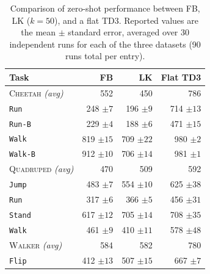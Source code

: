\documentclass{article}
\theoremstyle{plain}
\theoremstyle{definition}
\theoremstyle{remark}
\begin{document}
\begin{table}[t]
\centering
\caption{Comparison of zero-shot performance between FB, LK ($k=50$), and a flat TD3. Reported values are the mean $\pm$ standard error, averaged over 30 independent runs for each of the three datasets (90 runs total per entry).}
\setlength{\tabcolsep}{6pt}
\renewcommand{\arraystretch}{1.3}
\footnotesize
\label{tab:zero-shot-comp}
\begin{tabular}{lrrr}
\toprule
\textbf{Task} & \textbf{FB} & \textbf{LK} & \textbf{Flat TD3} \\
\midrule

\rowcolor{gray!15}
\textsc{Cheetah} \textit{(avg)} & 552 & 450 & 786 \\
\hspace{.5em} \texttt{Run} & 248 ${\scriptstyle \pm 7}$ & 196 ${\scriptstyle \pm 9}$ & 714 ${\scriptstyle \pm 13}$ \\
\hspace{.5em} \texttt{Run-B} & 229 ${\scriptstyle \pm 4}$ & 188 ${\scriptstyle \pm 6}$ & 471 ${\scriptstyle \pm 15}$ \\
\hspace{.5em} \texttt{Walk} & 819 ${\scriptstyle \pm 15}$ & 709 ${\scriptstyle \pm 22}$ & 980 ${\scriptstyle \pm 2}$ \\
\hspace{.5em} \texttt{Walk-B} & 912 ${\scriptstyle \pm 10}$ & 706 ${\scriptstyle \pm 14}$ & 981 ${\scriptstyle \pm 1}$ \\
\addlinespace
\rowcolor{gray!15}
\textsc{Quadruped} \textit{(avg)} & 470 & 509 & 592 \\
\hspace{.5em} \texttt{Jump} & 483 ${\scriptstyle \pm 7}$ & 554 ${\scriptstyle \pm 10}$ & 625 ${\scriptstyle \pm 38}$ \\
\hspace{.5em} \texttt{Run} & 317 ${\scriptstyle \pm 6}$ & 366 ${\scriptstyle \pm 5}$ & 456 ${\scriptstyle \pm 31}$ \\
\hspace{.5em} \texttt{Stand} & 617 ${\scriptstyle \pm 12}$ & 705 ${\scriptstyle \pm 14}$ & 708 ${\scriptstyle \pm 35}$ \\
\hspace{.5em} \texttt{Walk} & 461 ${\scriptstyle \pm 9}$ & 410 ${\scriptstyle \pm 11}$ & 578 ${\scriptstyle \pm 48}$ \\
\addlinespace
\rowcolor{gray!15}
\textsc{Walker} \textit{(avg)} & 584 & 582 & 780 \\
\hspace{.5em} \texttt{Flip} & 412 ${\scriptstyle \pm 13}$ & 507 ${\scriptstyle \pm 15}$ & 667 ${\scriptstyle \pm 7}$ \\

\end{tabular}
\end{table}
\end{document}

